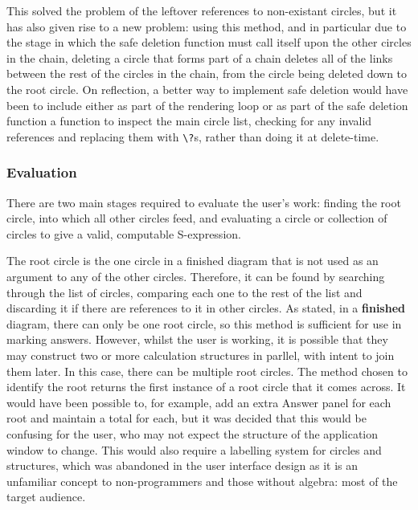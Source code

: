 \documentclass[12pt,twoside,notitlepage,xetex]{report}
\begin{document}
This solved the problem of the leftover references to non-existant circles, but it has also given rise to a new problem: using this method, and in particular due to the stage in which the safe deletion function must call itself upon the other circles in the chain, deleting a circle that forms part of a chain deletes all of the links between the rest of the circles in the chain, from the circle being deleted down to the root circle.  On reflection, a better way to implement safe deletion would have been to include either as part of the rendering loop or as part of the safe deletion function a function to inspect the main circle list, checking for any invalid references and replacing them with \verb¬\?¬s, rather than doing it at delete-time.

\subsubsection{Evaluation}

There are two main stages required to evaluate the user's work: finding the root circle, into which all other circles feed, and evaluating a circle or collection of circles to give a valid, computable S-expression.

The root circle is the one circle in a finished diagram that is not used as an argument to any of the other circles.  Therefore, it can be found by searching through the list of circles, comparing each one to the rest of the list and discarding it if there are references to it in other circles.  As stated, in a {\bf finished} diagram, there can only be one root circle, so this method is sufficient for use in marking answers.  However, whilst the user is working, it is possible that they may construct two or more calculation structures in parllel, with intent to join them later.  In this case, there can be multiple root circles.  The method chosen to identify the root returns the first instance of a root circle that it comes across.  It would have been possible to, for example, add an extra {\sfapp Answer} panel for each root and maintain a total for each, but it was decided that this would be confusing for the user, who may not expect the structure of the application window to change.  This would also require a labelling system for circles and structures, which was abandoned in the user interface design as it is an unfamiliar concept to non-programmers and those without algebra: most of the target audience.
\end{document}
